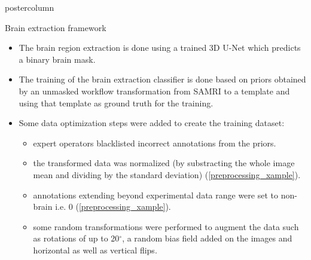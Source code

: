 \begin{frame}
\begin{columns}
\begin{column}{.42\textwidth}
\begin{beamercolorbox}[center]{postercolumn}
\begin{minipage}{.98\textwidth}
{%
                            \begin{myblock}{Brain extraction framework}
                                \begin{itemize}
                                    \item The brain region extraction is done using a trained 3D U-Net \cite{ronneberger_u-net:_2015} which predicts a binary brain mask.
                                    \item The training of the brain extraction classifier is done based on priors obtained by an unmasked workflow transformation from \textcolor{lg}{SAMRI} \cite{irsabi} to a template and using that template as ground truth for the training.
                                    \item Some data optimization steps were added to create the training dataset:
                                    \begin{itemize}
                                        \item expert operators blacklisted incorrect annotations from the priors.
                                        \item the transformed data was normalized (by substracting the whole image mean and dividing by the standard deviation) (\cref{preprocessing_xample}).
                                        \item annotations extending beyond experimental data range were set to non-brain i.e. 0 (\cref{preprocessing_xample}).
                                        \item some random transformations were performed to augment the data such as rotations of up to 20$^{\circ}$, a random bias field added on the images and horizontal as well as vertical flips.

                                    \end{itemize}
                                \end{itemize}

                                \vspace{1em}


\end{myblock}}
\end{minipage}
\end{beamercolorbox}
\end{column}
\end{columns}
\end{frame}
